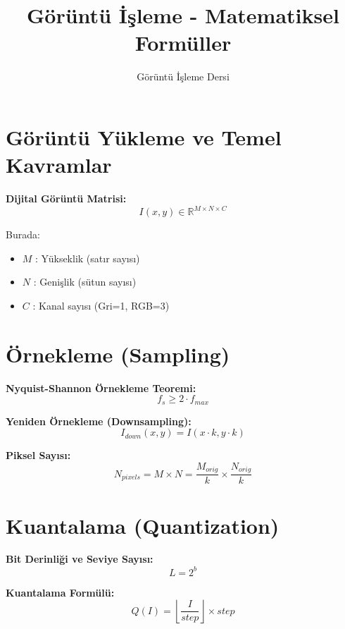 \documentclass[12pt,a4paper]{article}
\title{Görüntü İşleme - Matematiksel Formüller}
\author{Görüntü İşleme Dersi}
\date{}
\begin{document}
\maketitle

\section{Görüntü Yükleme ve Temel Kavramlar}

\textbf{Dijital Görüntü Matrisi:}
\begin{equation}
I(x,y) \in \mathbb{R}^{M \times N \times C}
\end{equation}

Burada:
\begin{itemize}
    \item $M$ : Yükseklik (satır sayısı)
    \item $N$ : Genişlik (sütun sayısı)
    \item $C$ : Kanal sayısı (Gri=1, RGB=3)
\end{itemize}

\section{Örnekleme (Sampling)}

\textbf{Nyquist-Shannon Örnekleme Teoremi:}
\begin{equation}
f_s \geq 2 \cdot f_{max}
\end{equation}

\textbf{Yeniden Örnekleme (Downsampling):}
\begin{equation}
I_{down}(x,y) = I(x \cdot k, y \cdot k)
\end{equation}

\textbf{Piksel Sayısı:}
\begin{equation}
N_{pixels} = M \times N = \frac{M_{orig}}{k} \times \frac{N_{orig}}{k}
\end{equation}

\section{Kuantalama (Quantization)}

\textbf{Bit Derinliği ve Seviye Sayısı:}
\begin{equation}
L = 2^b
\end{equation}

\textbf{Kuantalama Formülü:}
\begin{equation}
Q(I) = \left\lfloor \frac{I}{step} \right\rfloor \times step
\end{equation}
\end{document}
